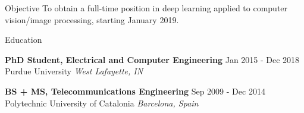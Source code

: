 \documentclass{resume} %
\begin{document}
\vspace{-6pt}
\begin{rSection}{Objective}
To obtain a full-time position in deep learning applied to computer vision/image processing, starting January 2019.

\end{rSection}

\begin{rSection}{Education}

{\bf PhD Student, Electrical and Computer Engineering} \hfill {Jan 2015 - Dec 2018} \\
Purdue University \hfill {\em West Lafayette, IN\\}


{\bf BS + MS, Telecommunications Engineering} \hfill {Sep 2009 - Dec 2014} \\ 
Polytechnic University of Catalonia \hfill {\em Barcelona, Spain}

\vspace{4pt}

\end{rSection}

\end{document}
